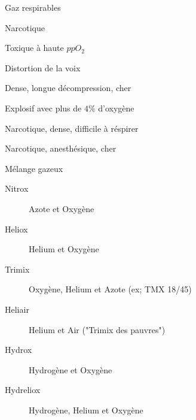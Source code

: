 \documentclass[aspectratio=1610,english,12pt]{beamer}
\begin{document}
\begin{frame}{Gaz respirables}
	\begin{description}[lalign=parleft]
		\item[Nitrogen ($N_2$)]Narcotique
		\item[Oxygen ($O_2$)]Toxique à haute $ppO_2$
		\item[Helium ($He$)]Distortion de la voix
		\item[Neon ($Ne$)] Dense, longue décompression, cher 
		\item[Hydrogen ($H$)] Explosif avec plus de $4\%$ d'oxygène
		\item[Argon ($Ar$)]Narcotique, dense, difficile à réspirer
		\item[Xenon ($Xe$)]Narcotique, anesthésique, cher
	\end{description}
\end{frame}

\begin{frame}{Mélange gazeux}
	\begin{description}
		\item[Nitrox]Azote et Oxygène
		\item[Heliox]Helium et Oxygène
		\item[Trimix]Oxygène, Helium et Azote (ex; TMX 18/45)
		\item[Heliair]Helium et Air ("Trimix des pauvres")
		\item[Hydrox]Hydrogène et Oxygène
		\item[Hydreliox]Hydrogène, Helium et Oxygène
	\end{description}
\end{frame}

\end{document}
